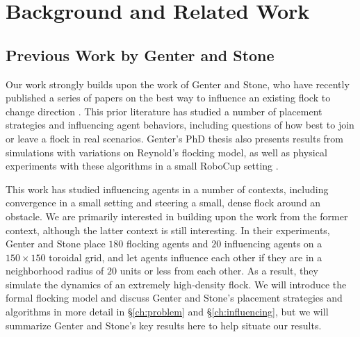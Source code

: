 
\chapter{Background and Related Work}
\label{ch:background}

\section{Previous Work by Genter and Stone}
Our work strongly builds upon the work of Genter and Stone, who have recently
published a series of papers on the best way to influence an existing flock to
change direction \cite{genter2015placement, genter2014neighborsorientherd,
genter2013visionstationary, genter2013backsearch,
genter2016facegoalfacecurrent, genter201612steplookahead}.
This prior literature has studied a number of placement strategies and
influencing agent behaviors, including questions of how best to join or leave
a flock in real scenarios.
Genter's PhD thesis also presents results from simulations with variations on
Reynold's flocking model, as well as physical experiments with these algorithms
in a small RoboCup setting \cite{genterthesis}.

This work has studied influencing agents in a number of contexts, including
convergence in a small setting and steering a small, dense flock around an
obstacle.
We are primarily interested in building upon the work from the former context,
although the latter context is still interesting.
In their experiments, Genter and Stone place $180$ flocking agents and $20$
influencing agents on a $150\times150$ toroidal grid, and let agents influence
each other if they are in a neighborhood radius of $20$ units or less from each
other.
As a result, they simulate the dynamics of an extremely high-density flock.
We will introduce the formal flocking model and discuss Genter and Stone's
placement strategies and algorithms in more detail in \S\ref{ch:problem} and
\S\ref{ch:influencing}, but we will summarize Genter and Stone's key results
here to help situate our results.

